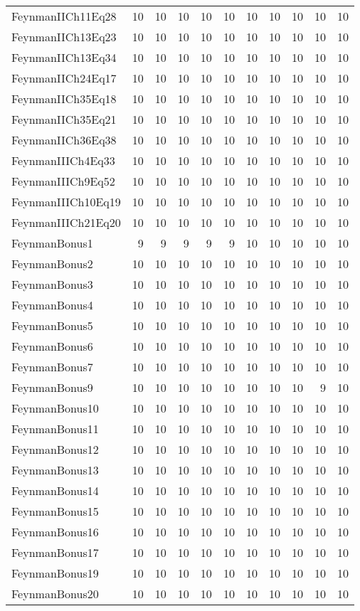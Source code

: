 \begin{tabular}{lrrrrrrrrrr}
FeynmanIICh11Eq28 & 10 & 10 & 10 & 10 & 10 & 10 & 10 & 10 & 10 & 10 \\
FeynmanIICh13Eq23 & 10 & 10 & 10 & 10 & 10 & 10 & 10 & 10 & 10 & 10 \\
FeynmanIICh13Eq34 & 10 & 10 & 10 & 10 & 10 & 10 & 10 & 10 & 10 & 10 \\
FeynmanIICh24Eq17 & 10 & 10 & 10 & 10 & 10 & 10 & 10 & 10 & 10 & 10 \\
FeynmanIICh35Eq18 & 10 & 10 & 10 & 10 & 10 & 10 & 10 & 10 & 10 & 10 \\
FeynmanIICh35Eq21 & 10 & 10 & 10 & 10 & 10 & 10 & 10 & 10 & 10 & 10 \\
FeynmanIICh36Eq38 & 10 & 10 & 10 & 10 & 10 & 10 & 10 & 10 & 10 & 10 \\
FeynmanIIICh4Eq33 & 10 & 10 & 10 & 10 & 10 & 10 & 10 & 10 & 10 & 10 \\
FeynmanIIICh9Eq52 & 10 & 10 & 10 & 10 & 10 & 10 & 10 & 10 & 10 & 10 \\
FeynmanIIICh10Eq19 & 10 & 10 & 10 & 10 & 10 & 10 & 10 & 10 & 10 & 10 \\
FeynmanIIICh21Eq20 & 10 & 10 & 10 & 10 & 10 & 10 & 10 & 10 & 10 & 10 \\
FeynmanBonus1 & 9 & 9 & 9 & 9 & 9 & 10 & 10 & 10 & 10 & 10 \\
FeynmanBonus2 & 10 & 10 & 10 & 10 & 10 & 10 & 10 & 10 & 10 & 10 \\
FeynmanBonus3 & 10 & 10 & 10 & 10 & 10 & 10 & 10 & 10 & 10 & 10 \\
FeynmanBonus4 & 10 & 10 & 10 & 10 & 10 & 10 & 10 & 10 & 10 & 10 \\
FeynmanBonus5 & 10 & 10 & 10 & 10 & 10 & 10 & 10 & 10 & 10 & 10 \\
FeynmanBonus6 & 10 & 10 & 10 & 10 & 10 & 10 & 10 & 10 & 10 & 10 \\
FeynmanBonus7 & 10 & 10 & 10 & 10 & 10 & 10 & 10 & 10 & 10 & 10 \\
FeynmanBonus9 & 10 & 10 & 10 & 10 & 10 & 10 & 10 & 10 & 9 & 10 \\
FeynmanBonus10 & 10 & 10 & 10 & 10 & 10 & 10 & 10 & 10 & 10 & 10 \\
FeynmanBonus11 & 10 & 10 & 10 & 10 & 10 & 10 & 10 & 10 & 10 & 10 \\
FeynmanBonus12 & 10 & 10 & 10 & 10 & 10 & 10 & 10 & 10 & 10 & 10 \\
FeynmanBonus13 & 10 & 10 & 10 & 10 & 10 & 10 & 10 & 10 & 10 & 10 \\
FeynmanBonus14 & 10 & 10 & 10 & 10 & 10 & 10 & 10 & 10 & 10 & 10 \\
FeynmanBonus15 & 10 & 10 & 10 & 10 & 10 & 10 & 10 & 10 & 10 & 10 \\
FeynmanBonus16 & 10 & 10 & 10 & 10 & 10 & 10 & 10 & 10 & 10 & 10 \\
FeynmanBonus17 & 10 & 10 & 10 & 10 & 10 & 10 & 10 & 10 & 10 & 10 \\
FeynmanBonus19 & 10 & 10 & 10 & 10 & 10 & 10 & 10 & 10 & 10 & 10 \\
FeynmanBonus20 & 10 & 10 & 10 & 10 & 10 & 10 & 10 & 10 & 10 & 10 \\
\bottomrule
\end{tabular}

